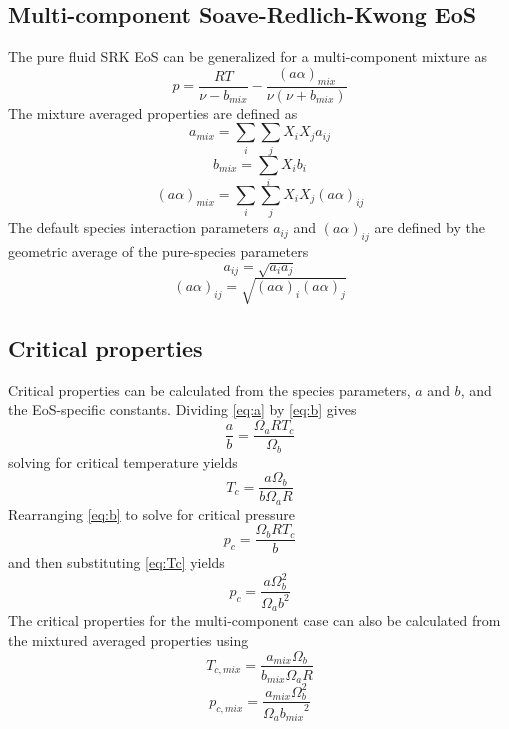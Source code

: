 \documentclass{article}
\begin{document}
\subsection{Multi-component Soave-Redlich-Kwong EoS}
The pure fluid SRK EoS can be generalized for a multi-component mixture as
\begin{equation}
    p = \frac{RT}{\nu-b_{mix}}-\frac{(a\alpha)_{mix}}{\nu(\nu+b_{mix})}\label{eq:multicomponent}
\end{equation}
The mixture averaged properties are defined as 
\begin{equation}
    a_{mix} = \sum_i \sum_j X_i X_j a_{ij}
\end{equation}
\begin{equation}
    b_{mix} = \sum_i X_i b_i
\end{equation}
\begin{equation}
    (a\alpha)_{mix} = \sum_i \sum_j X_i X_j (a\alpha)_{ij}\label{eq:aalpha_mix}
\end{equation}
The default species interaction parameters $a_{ij}$ and $(a\alpha)_{ij}$ are defined by the geometric average of the pure-species parameters
\begin{equation}
    a_{ij} = \sqrt{a_i a_j}
\end{equation}
\begin{equation}
    (a\alpha)_{ij} = \sqrt{(a\alpha)_i(a\alpha)_j}\label{eq:aalpha_ij}
\end{equation}


\subsection{Critical properties}
Critical properties can be calculated from the species parameters, $a$ and $b$, and the EoS-specific constants.
Dividing \eqref{eq:a} by \eqref{eq:b} gives
\begin{equation*}
    \frac{a}{b} = \frac{\Omega_aRT_c}{\Omega_b}
\end{equation*}
solving for critical temperature yields
\begin{equation}
    T_c = \frac{a\Omega_b}{b\Omega_a R}\label{eq:Tc}
\end{equation}
Rearranging \eqref{eq:b} to solve for critical pressure
\begin{equation*}
    p_c = \frac{\Omega_bRT_c}{b}
\end{equation*}
and then substituting \eqref{eq:Tc} yields
\begin{equation}
    p_c = \frac{a\Omega_b^2}{\Omega_ab^2}\label{eq:PC}
\end{equation}
The critical properties for the multi-component case can also be calculated from the mixtured averaged properties using 
\begin{equation}
    T_{c,mix} = \frac{a_{mix}\Omega_b}{b_{mix}\Omega_a R}\label{eq:Tc_mix}
\end{equation}
\begin{equation}
    p_{c,mix} = \frac{a_{mix}\Omega_b^2}{\Omega_a{b_{mix}}^2}\label{eq:PC_mix}
\end{equation}
\end{document}
